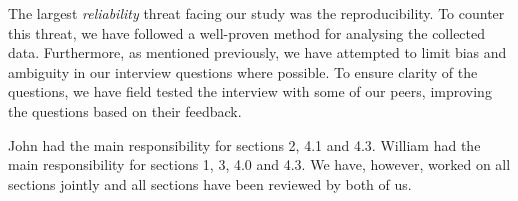\documentclass[10pt,twocolumn]{article}
\begin{document}
The largest \textit{reliability} threat facing our study was the reproducibility. To counter this threat, we have followed a well-proven method for analysing the collected data. Furthermore, as mentioned previously, we have attempted to limit bias and ambiguity in our interview questions where possible. To ensure clarity of the questions, we have field tested the interview with some of our peers, improving the questions based on their feedback.






John had the main responsibility for sections 2, 4.1 and 4.3. William had the main responsibility for sections 1, 3, 4.0 and 4.3. We have, however, worked on all sections jointly and all sections have been reviewed by both of us. 
\end{document}
